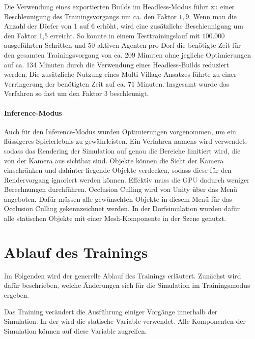 Die Verwendung eines exportierten Builds im Headless-Modus führt zu einer Beschleunigung des Trainingsvorgangs um ca. den Faktor $1,9$. Wenn man die Anzahl der Dörfer von 1 auf 6 erhöht, wird eine zusätzliche Beschleunigung um den Faktor 1,5 erreicht. So konnte in einem Testtrainingslauf mit $100.000$ ausgeführten Schritten und 50 aktiven Agenten pro Dorf die benötigte Zeit für den gesamten Trainingsvorgang von ca. 209 Minuten ohne jegliche Optimierungen auf ca. 134 Minuten durch die Verwendung eines Headless-Builds reduziert werden. Die zusätzliche Nutzung eines Multi-Village-Ansatzes führte zu einer Verringerung der benötigten Zeit auf ca. 71 Minuten. Insgesamt wurde das Verfahren so fast um den Faktor $3$ beschleunigt.

\paragraph{Inference-Modus}
Auch für den Inference-Modus wurden Optimierungen vorgenommen, um ein flüssigeres Spielerlebnis zu gewährleisten. Ein Verfahren namens  wird verwendet, sodass das Rendering der Simulation auf genau die Bereiche limitiert wird, die von der Kamera aus sichtbar sind. Objekte können die Sicht der Kamera einschränken und dahinter liegende Objekte verdecken, sodass diese für den Rendervorgang ignoriert werden können. Effektiv muss die GPU dadurch weniger Berechnungen durchführen. Occlusion Culling wird von Unity über das Menü  angeboten. Dafür müssen alle gewünschten Objekte in diesem Menü für das Occlusion Culling gekennzeichnet werden. In der Dorfsimulation wurden dafür alle statischen Objekte mit einer Mesh-Komponente in der Szene genutzt.







\section{Ablauf des Trainings}
Im Folgenden wird der generelle Ablauf des Trainings erläutert. Zunächst wird dafür beschrieben, welche Änderungen sich für die Simulation im Trainingsmodus ergeben.   

Das Training verändert die Ausführung einiger Vorgänge innerhalb der Simulation. In der  wird die statische Variable  verwendet. Alle Komponenten der Simulation können auf diese Variable zugreifen.

